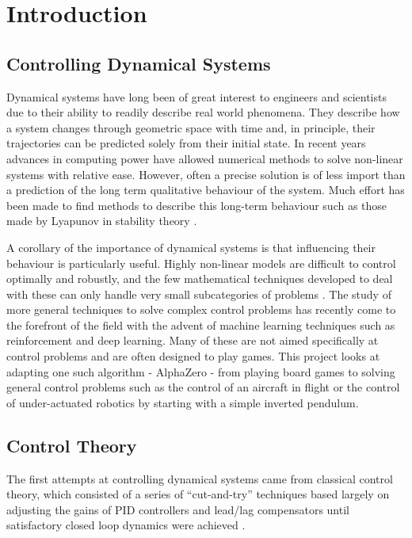 \documentclass[../main.tex]{subfiles}
\begin{document}
\chapter{Introduction}

\section{Controlling Dynamical Systems}
Dynamical systems have long been of great interest to engineers and scientists due to their ability to readily describe real world phenomena. They describe how a system changes through geometric space with time and, in principle, their trajectories can be predicted solely from their initial state. In recent years advances in computing power have allowed numerical methods to solve non-linear systems with relative ease. However, often a precise solution is of less import than a prediction of the long term qualitative behaviour of the system. Much effort has been made to find methods to describe this long-term behaviour such as those made by Lyapunov in stability theory \cite{4f2}. 

A corollary of the importance of dynamical systems is that influencing their behaviour is particularly useful. Highly non-linear models are difficult to control optimally and robustly, and the few mathematical techniques developed to deal with these can only handle very small subcategories of problems \cite{4f2, 4f3}. The study of more general techniques to solve complex control problems has recently come to the forefront of the field with the advent of machine learning techniques such as reinforcement and deep learning. Many of these are not aimed specifically at control problems and are often designed to play games. This project looks at adapting one such algorithm - AlphaZero - from playing board games to solving general control problems such as the control of an aircraft in flight or the control of under-actuated robotics by starting with a simple inverted pendulum.

\section{Control Theory}
The first attempts at controlling dynamical systems came from classical control theory, which consisted of a series of ``cut-and-try'' techniques based largely on adjusting the gains of PID controllers and lead/lag compensators until satisfactory closed loop dynamics were achieved \cite{History}.
\end{document}
